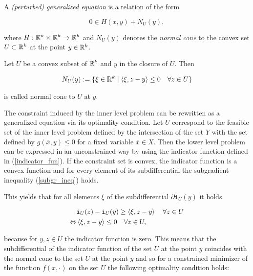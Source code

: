 A \emph{(perturbed) generalized equation} is a relation of the form

\[ 0 \in H(x,y)+N_{U}(y), \]

where \(H:\mathbb{R}^n\times \mathbb{R}^k \to \mathbb{R}^k\) and \(N_{U}(y)\) denotes the \emph{normal cone} to the convex set \(U \subset \mathbb{R}^k\) at the point \(y\in \mathbb{R}^k\).

\begin{definition}
	Let \(U\) be a convex subset of \(\mathbb{R}^k\) and \(y\) in the closure of \(U\). Then
	
	\begin{equation*}
		N_U(y) := \{\xi\in \mathbb{R}^k \mid \left\langle \xi,z-y\right\rangle \leq 0 \quad \forall z \in U \}
	\label{norm_cone}
	\end{equation*}
	
	is called normal cone to \(U\) at \(y\).
\end{definition}
 
The constraint induced by the inner level problem can be rewritten as a generalized equation via its optimality condition.
Let \(U\) correspond to the feasible set of the inner level problem defined by the intersection of the set \(Y\) with the set defined by \(g(\bar{x},y)\leq 0\) for a fixed variable \(\bar{x} \in X \).
Then the lower level problem can be expressed in an unconstrained way by using the indicator function defined in (\ref{indicator_fun}). If the constraint set is convex, the indicator function is a convex function and for every element of its subdifferential the subgradient inequality (\ref{subgr_ineq}) holds.

This yields that for all elements \(\xi\) of the subdifferential \(\partial \mathtt{i}_U(y)\) it holds

\begin{equation*}
\begin{split}
	&\mathtt{i}_U(z)-\mathtt{i}_U(y) \geq \left\langle \xi, z-y\right\rangle \quad \forall z \in U \\
	\Leftrightarrow & \left\langle \xi, z-y\right\rangle \leq 0 \quad \forall z \in U,
\end{split}
\end{equation*}

because for \(y,z \in U\) the indicator function is zero. This means that the subdifferential of the indicator function of the set \(U\) at the point \(y\) coincides with the normal cone to the set \(U\) at the point \(y\) and so for a constrained minimizer of the function \(f(x,\cdot)\) on the set \(U\) the following optimality condition holds:

